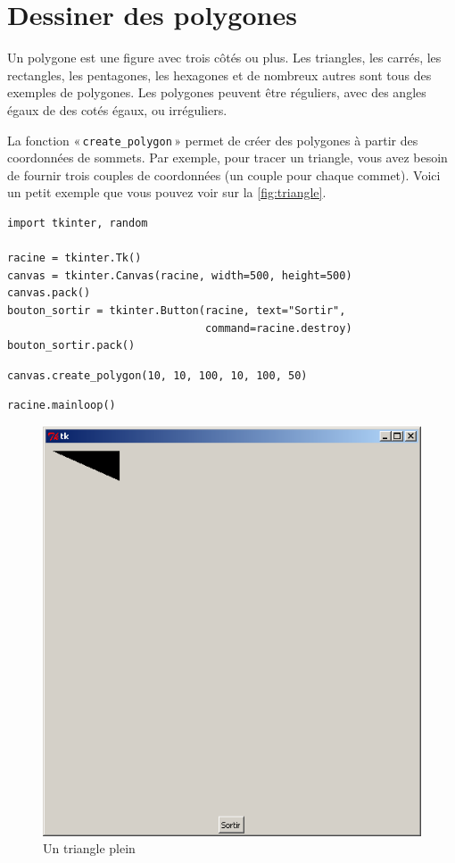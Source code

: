 \section{Dessiner des polygones}
Un polygone est une figure avec trois côtés ou plus. 
Les triangles, les carrés, les rectangles, les pentagones, les hexagones et de nombreux autres sont tous des exemples de polygones. Les polygones peuvent être réguliers, avec des angles égaux de des cotés égaux, ou irréguliers. 

La fonction « \texttt{create\_polygon} » permet de créer des polygones à partir des coordonnées de sommets.
Par exemple, pour tracer un triangle, vous avez besoin de fournir trois couples de coordonnées (un couple pour chaque commet). Voici un petit exemple que vous pouvez voir sur la \autoref{fig:triangle}.

\begin{Verbatim}[frame=single,rulecolor=\color{mbleu}, label=à taper ne sera pas répété]
import tkinter, random

racine = tkinter.Tk()
canvas = tkinter.Canvas(racine, width=500, height=500)
canvas.pack()
bouton_sortir = tkinter.Button(racine, text="Sortir",
                               command=racine.destroy)
bouton_sortir.pack()
\end{Verbatim}
\begin{Verbatim}[frame=single,rulecolor=\color{mbleu}, label=à taper]
canvas.create_polygon(10, 10, 100, 10, 100, 50)
\end{Verbatim}
\begin{Verbatim}[frame=single,rulecolor=\color{mbleu}, label=à taper ne sera pas répété]
racine.mainloop()
\end{Verbatim}

\begin{figure}[h!]
\centering
\includegraphics[scale=0.4]{images/triangle}
\caption{Un triangle plein}\label{fig:triangle}
\end{figure}

